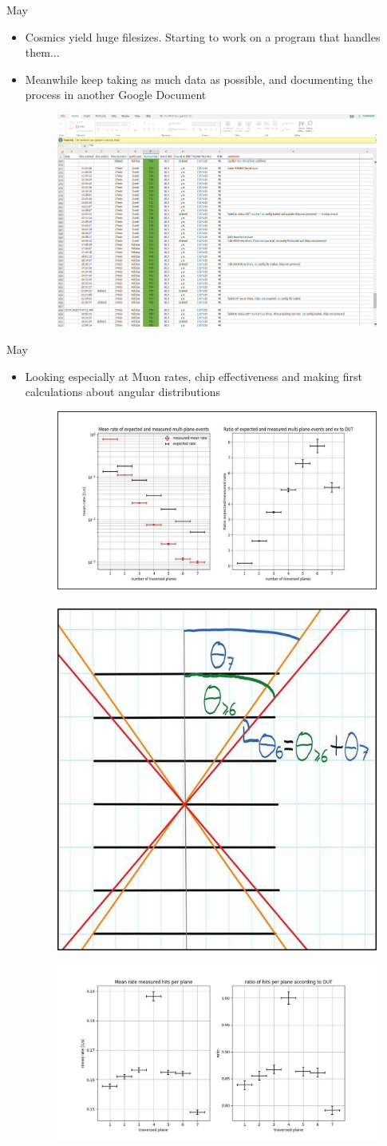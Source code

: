 \documentclass{beamer}
\begin{document}
\begin{frame}{May}
    \begin{itemize}
	\item Cosmics yield huge filesizes. Starting to work on a program that
	    handles them...
	\item Meanwhile keep taking as much data as possible, and
	    documenting the process in another Google Document
	    \begin{figure}[H]
		\centering
		\includegraphics[width=.4\textwidth]{DavidCosmicProgress.png}
	    \end{figure}
    \end{itemize}
\end{frame}
\begin{frame}{May}
    \begin{itemize}
	\item Looking especially at Muon rates, chip effectiveness and
	    making first calculations about angular distributions
	    \begin{figure}[H]
		\centering
		\includegraphics[width=.4\textwidth]{DavidFirstRate.jpg}
		\
		\includegraphics[width=.25\textwidth]{DavidFirstAngle.jpg}
	    \end{figure}
	    \begin{figure}[H]
		\centering
		\includegraphics[width=.4\textwidth]{DavidFirstEff.jpg}
	    \end{figure}
    \end{itemize}
\end{frame}
\end{document}
